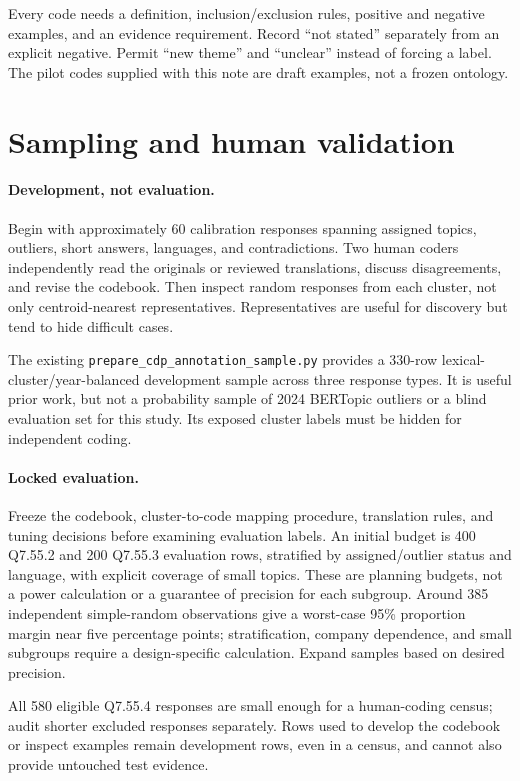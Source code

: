 \documentclass[11pt,a4paper]{article}
\begin{document}
Every code needs a definition, inclusion/exclusion rules, positive and
negative examples, and an evidence requirement. Record ``not stated''
separately from an explicit negative. Permit ``new theme'' and ``unclear''
instead of forcing a label. The pilot codes supplied with this note are
draft examples, not a frozen ontology.

\section{Sampling and human validation}
\paragraph{Development, not evaluation.}
Begin with approximately 60 calibration responses spanning assigned
topics, outliers, short answers, languages, and contradictions. Two human
coders independently read the originals or reviewed translations, discuss
disagreements, and revise the codebook. Then inspect random responses from
each cluster, not only centroid-nearest representatives. Representatives
are useful for discovery but tend to hide difficult cases.

The existing \texttt{prepare\_cdp\_annotation\_sample.py} provides a 330-row
lexical-cluster/year-balanced development sample across three response
types. It is useful prior work, but not a probability sample of 2024
BERTopic outliers or a blind evaluation set for this study. Its exposed
cluster labels must be hidden for independent coding.

\paragraph{Locked evaluation.}
Freeze the codebook, cluster-to-code mapping procedure, translation rules,
and tuning decisions before examining evaluation labels. An initial
budget is 400 Q7.55.2 and 200 Q7.55.3 evaluation rows, stratified by
assigned/outlier status and language, with explicit coverage of small
topics. These are planning budgets, not a power calculation or a guarantee
of precision for each subgroup. Around 385 independent simple-random
observations give a worst-case 95\% proportion margin near five percentage
points; stratification, company dependence, and small subgroups require a
design-specific calculation. Expand samples based on desired precision.

All 580 eligible Q7.55.4 responses are small enough for a human-coding
census; audit shorter excluded responses separately. Rows used to develop
the codebook or inspect examples remain development rows, even in a census,
and cannot also provide untouched test evidence.
\end{document}
